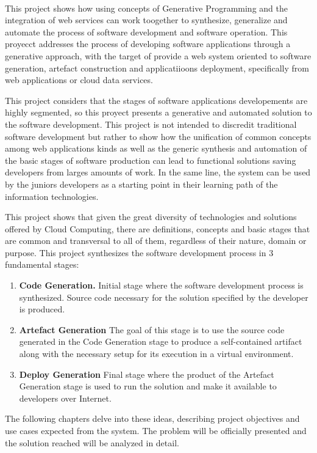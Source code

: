
\vspace{0.7cm}
\\


This project shows how using concepts of  Generative Programming and the integration of web services can work toogether to synthesize, generalize and automate the process of  software development and software operation. This proyecct  addresses the process of developing software applications through a generative approach, with the target of provide a web system oriented to software generation, artefact construction and applicatiioons deployment, specifically from web applications or cloud data services.

 
This project considers that the stages of software applications developements are highly segmented, so this proyect presents a generative and automated solution to the software development. This project is not intended to discredit traditional software development but rather to show how the unification of common concepts among web applications kinds as well as the generic synthesis and automation of the basic stages of software production can lead to functional solutions saving developers from larges amounts of work. In the same line, the system can be used by the juniors developers as a starting point in their learning path of the information technologies.
 
 
This project shows that given the great diversity of technologies and solutions offered by Cloud Computing, there are definitions, concepts and basic stages that are common and transversal to all of them, regardless of their nature, domain or purpose. This project synthesizes the software development process in 3 fundamental stages:

\begin{enumerate}
\item \textbf{ Code Generation. }  Initial stage where the software development process is synthesized. Source code necessary for the solution specified by the developer is produced.

\item \textbf{ Artefact Generation }  The goal of this stage is to use the source code generated in the Code Generation stage to produce a self-contained artifact along with the necessary setup for its execution in a virtual environment.

\item \textbf{ Deploy Generation } Final stage where the product of the Artefact Generation stage is used to run the solution and make it available to developers over Internet.
\end{enumerate}
 

The following chapters delve into these ideas, describing project objectives and use cases expected from the system. The problem will be officially presented and the solution reached will be analyzed in detail.

\\

\afterpage{\null\newpage}
\newpage